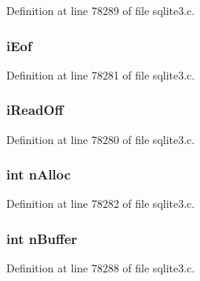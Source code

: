 Definition at line 78289 of file sqlite3.\+c.

\hypertarget{struct_pma_reader_ae2045ce697bd581b187644cebea747cf}{}
\subsubsection[{i\+Eof}]{ i\+Eof}\label{struct_pma_reader_ae2045ce697bd581b187644cebea747cf}


Definition at line 78281 of file sqlite3.\+c.

\hypertarget{struct_pma_reader_a09bb995de66249294e0ae4715340f797}{}
\subsubsection[{i\+Read\+Off}]{ i\+Read\+Off}\label{struct_pma_reader_a09bb995de66249294e0ae4715340f797}


Definition at line 78280 of file sqlite3.\+c.

\hypertarget{struct_pma_reader_aec887fbb53f08664685baf4fb69ba5f5}{}
\subsubsection[{n\+Alloc}]{\setlength{\rightskip}{0pt plus 5cm}int n\+Alloc}\label{struct_pma_reader_aec887fbb53f08664685baf4fb69ba5f5}


Definition at line 78282 of file sqlite3.\+c.

\hypertarget{struct_pma_reader_aaa5118b1ad1ecd130e422b18371df061}{}
\subsubsection[{n\+Buffer}]{\setlength{\rightskip}{0pt plus 5cm}int n\+Buffer}\label{struct_pma_reader_aaa5118b1ad1ecd130e422b18371df061}


Definition at line 78288 of file sqlite3.\+c.

\hypertarget{struct_pma_reader_aec3f75e476fad43cd9f74b896c9c7a14}{}
